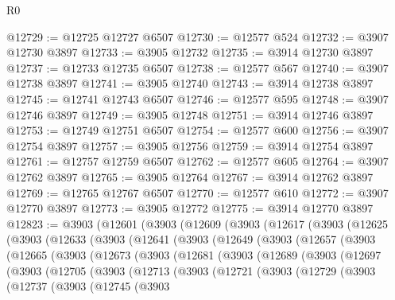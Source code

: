 \begin{lexlean}{R0}
\begin{coremodule}
@12729 := @12725 @12727 @6507
@12730 := @12577 @524
@12732 := @3907 @12730 @3897
@12733 := @3905 @12732
@12735 := @3914 @12730 @3897
@12737 := @12733 @12735 @6507
@12738 := @12577 @567
@12740 := @3907 @12738 @3897
@12741 := @3905 @12740
@12743 := @3914 @12738 @3897
@12745 := @12741 @12743 @6507
@12746 := @12577 @595
@12748 := @3907 @12746 @3897
@12749 := @3905 @12748
@12751 := @3914 @12746 @3897
@12753 := @12749 @12751 @6507
@12754 := @12577 @600
@12756 := @3907 @12754 @3897
@12757 := @3905 @12756
@12759 := @3914 @12754 @3897
@12761 := @12757 @12759 @6507
@12762 := @12577 @605
@12764 := @3907 @12762 @3897
@12765 := @3905 @12764
@12767 := @3914 @12762 @3897
@12769 := @12765 @12767 @6507
@12770 := @12577 @610
@12772 := @3907 @12770 @3897
@12773 := @3905 @12772
@12775 := @3914 @12770 @3897
@12823 := @3903
    (@12601
      (@3903
        (@12609
          (@3903
            (@12617
              (@3903
                (@12625
                  (@3903
                    (@12633
                      (@3903
                        (@12641
                          (@3903
                            (@12649
                              (@3903
                                (@12657
                                  (@3903
                                    (@12665
                                      (@3903
                                        (@12673
                                          (@3903
                                            (@12681
                                              (@3903
                                                (@12689
                                                  (@3903
                                                    (@12697
                                                      (@3903
                                                        (@12705
                                                          (@3903
                                                            (@12713
                                                              (@3903
                                                                (@12721
                                                                  (@3903
                                                                    (@12729
                                                                      (@3903
                                                                        (@12737
                                                                          (@3903
                                                                            (@12745
                                                                              (@3903

\end{coremodule}
\end{lexlean}
